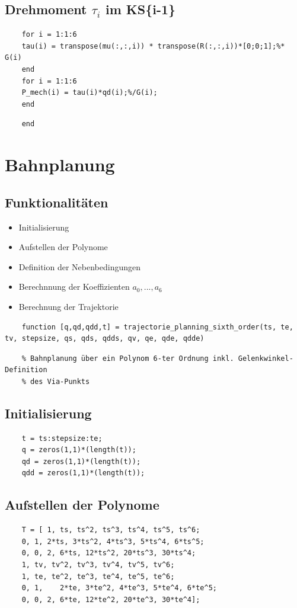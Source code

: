 \subsection*{Drehmoment $\tau_i$ im KS\{i-1\}}
%
\begin{lstlisting}
	for i = 1:1:6
	tau(i) = transpose(mu(:,:,i)) * transpose(R(:,:,i))*[0;0;1];%* G(i)
	end
	for i = 1:1:6
	P_mech(i) = tau(i)*qd(i);%/G(i);
	end
\end{lstlisting}
\begin{lstlisting}
	end
\end{lstlisting}
\section{Bahnplanung}
\label{add:traj}
%
\subsection*{Funktionalitäten}
%
\begin{itemize}
	\setlength{\itemsep}{-1ex}
	\item Initialisierung
	\item Aufstellen der Polynome
	\item Definition der Nebenbedingungen
	\item Berechnnung der Koeffizienten $a_0,...,a_6$
	\item Berechnung der Trajektorie
\end{itemize}
\begin{lstlisting}
	function [q,qd,qdd,t] = trajectorie_planning_sixth_order(ts, te, tv, stepsize, qs, qds, qdds, qv, qe, qde, qdde)
\end{lstlisting}
\begin{lstlisting}
	% Bahnplanung über ein Polynom 6-ter Ordnung inkl. Gelenkwinkel-Definition
	% des Via-Punkts
\end{lstlisting}
%
\subsection*{Initialisierung}
%
\begin{lstlisting}
	t = ts:stepsize:te;
	q = zeros(1,1)*(length(t));
	qd = zeros(1,1)*(length(t));
	qdd = zeros(1,1)*(length(t));
\end{lstlisting}
%
\subsection*{Aufstellen der Polynome}
%
\begin{lstlisting}
	T = [ 1, ts, ts^2, ts^3, ts^4, ts^5, ts^6;
	0, 1, 2*ts, 3*ts^2, 4*ts^3, 5*ts^4, 6*ts^5;
	0, 0, 2, 6*ts, 12*ts^2, 20*ts^3, 30*ts^4;
	1, tv, tv^2, tv^3, tv^4, tv^5, tv^6;
	1, te, te^2, te^3, te^4, te^5, te^6;
	0, 1, 	 2*te, 3*te^2, 4*te^3, 5*te^4, 6*te^5;
	0, 0, 2, 6*te, 12*te^2, 20*te^3, 30*te^4];
\end{lstlisting}
%
